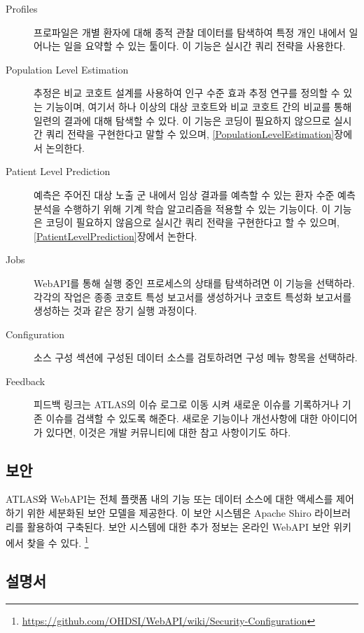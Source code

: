 \documentclass[10.5pt]{book}
\let\rmarkdownfootnote\footnote%
\def\footnote{\protect\rmarkdownfootnote}
\theoremstyle{definition}
\theoremstyle{definition}
\theoremstyle{definition}
\theoremstyle{remark}
\begin{document}
\begin{description}
\item[Profiles ]
프로파일은 개별 환자에 대해 종적 관찰 데이터를 탐색하여 특정 개인 내에서
일어나는 일을 요약할 수 있는 툴이다. 이 기능은 실시간 쿼리 전략을
사용한다.
\item[Population Level Estimation
]
추정은 비교 코호트 설계를 사용하여 인구 수준 효과 추정 연구를 정의할 수
있는 기능이며, 여기서 하나 이상의 대상 코호트와 비교 코호트 간의 비교를
통해 일련의 결과에 대해 탐색할 수 있다. 이 기능은 코딩이 필요하지
않으므로 실시간 쿼리 전략을 구현한다고 말할 수 있으며,
\ref{PopulationLevelEstimation}장에서 논의한다.
\item[Patient Level Prediction ]
예측은 주어진 대상 노출 군 내에서 임상 결과를 예측할 수 있는 환자 수준
예측 분석을 수행하기 위해 기계 학습 알고리즘을 적용할 수 있는 기능이다.
이 기능은 코딩이 필요하지 않음으로 실시간 쿼리 전략을 구현한다고 할 수
있으며, \ref{PatientLevelPrediction}장에서 논한다.
\item[Jobs ]
WebAPI를 통해 실행 중인 프로세스의 상태를 탐색하려면 이 기능을 선택하라.
각각의 작업은 종종 코호트 특성 보고서를 생성하거나 코호트 특성화
보고서를 생성하는 것과 같은 장기 실행 과정이다.
\item[Configuration ]
소스 구성 섹션에 구성된 데이터 소스를 검토하려면 구성 메뉴 항목을
선택하라.
\item[Feedback ]
피드백 링크는 ATLAS의 이슈 로그로 이동 시켜 새로운 이슈를 기록하거나
기존 이슈를 검색할 수 있도록 해준다. 새로운 기능이나 개선사항에 대한
아이디어가 있다면, 이것은 개발 커뮤니티에 대한 참고 사항이기도 하다.
\end{description}

\subsection{보안}

ATLAS와 WebAPI는 전체 플랫폼 내의 기능 또는 데이터 소스에 대한 액세스를
제어하기 위한 세분화된 보안 모델을 제공한다. 이 보안 시스템은 Apache
Shiro 라이브러리를 활용하여 구축된다. 보안 시스템에 대한 추가 정보는
온라인 WebAPI 보안 위키에서 찾을 수 있다. \footnote{\url{https://github.com/OHDSI/WebAPI/wiki/Security-Configuration}}

\subsection{설명서}
\end{document}
